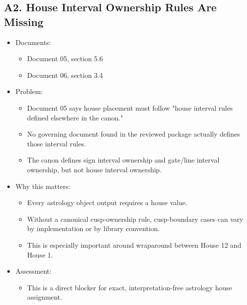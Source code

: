 \documentclass[11pt]{article}
\begin{document}
\subsection{A2. House Interval Ownership Rules Are Missing}
\label{sec:orgdb81f56}
\begin{itemize}
\item Documents:
\begin{itemize}
\item Document 05, section 5.6
\item Document 06, section 3.4
\end{itemize}
\item Problem:
\begin{itemize}
\item Document 05 says house placement must follow "house interval rules defined elsewhere in the canon."
\item No governing document found in the reviewed package actually defines those interval rules.
\item The canon defines sign interval ownership and gate/line interval ownership, but not house interval ownership.
\end{itemize}
\item Why this matters:
\begin{itemize}
\item Every astrology object output requires a house value.
\item Without a canonical cusp-ownership rule, cusp-boundary cases can vary by implementation or by library convention.
\item This is especially important around wraparound between House 12 and House 1.
\end{itemize}
\item Assessment:
\begin{itemize}
\item This is a direct blocker for exact, interpretation-free astrology house assignment.
\end{itemize}
\end{itemize}
\end{document}

